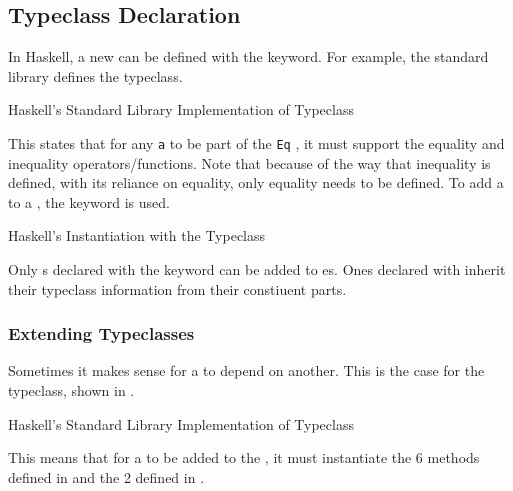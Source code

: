 \subsection{Typeclass Declaration}\label{subsec:Typeclass_Declaration}
In Haskell, a new  can be defined with the  keyword.
For example, the standard library defines the  typeclass.

\begin{listing}[h!tbp]
\caption{Haskell's Standard Library Implementation of  Typeclass}
\label{lst:Eq_Typeclass_Definition}
\end{listing}

This states that for any  \texttt{a} to be part of the \texttt{Eq} , it must support the equality and inequality operators/functions.
Note that because of the way that inequality is defined, with its reliance on equality, only equality needs to be defined.
To add a  to a , the  keyword is used.

\begin{listing}[h!tbp]
\caption{Haskell's  Instantiation with the  Typeclass}
\label{lst:Eq_Typeclass_Instance}
\end{listing}

Only s declared with the  keyword can be added to es.
Ones declared with  inherit their typeclass information from their constiuent parts.

\subsubsection{Extending Typeclasses}\label{subsubsec:Extending_Typeclasses}
Sometimes it makes sense for a  to depend on another.
This is the case for the  typeclass, shown in .

\begin{listing}[h!tbp]
\caption{Haskell's Standard Library Implementation of  Typeclass}
\label{lst:Ord_Typeclass_Definition}
\end{listing}

This means that for a  to be added to the  , it must instantiate the 6 methods defined in  and the 2 defined in .


